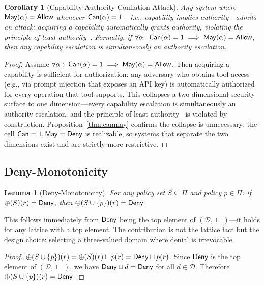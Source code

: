 \documentclass[11pt,a4paper]{article}
\newtheorem{corollary}[definition]{Corollary}
\newtheorem{lemma}[definition]{Lemma}
\newcommand{\termlabel}[1]{\ifmmode\mathsf{#1}\else{\normalfont\textsc{\MakeLowercase{#1}}}\fi}
\newcommand{\May}{\termlabel{May}}
\newcommand{\Can}{\termlabel{Can}}
\newcommand{\Allow}{\termlabel{Allow}}
\newcommand{\Deny}{\termlabel{Deny}}
\begin{document}
\begin{corollary}[Capability-Authority Conflation Attack]
\label{cor:conflation}
Any system where $\May(\alpha) = \Allow$ whenever $\Can(\alpha) = 1$---i.e., capability implies authority---admits an attack: acquiring a capability automatically grants authority, violating the principle of least authority~\citep{miller2006robust, dennis1966programming}. Formally, if $\forall \alpha: \Can(\alpha) = 1 \implies \May(\alpha) = \Allow$, then any capability escalation is simultaneously an authority escalation.
\end{corollary}

\begin{proof}
Assume $\forall\alpha:\; \Can(\alpha)=1 \implies \May(\alpha)=\Allow$.  Then acquiring a capability is sufficient for authorization: any adversary who obtains tool access (e.g., via prompt injection that exposes an API key) is automatically authorized for every operation that tool supports. This collapses a two-dimensional security surface to one dimension---every capability escalation is simultaneously an authority escalation, and the principle of least authority~\citep{miller2006robust, dennis1966programming} is violated by construction. Proposition~\ref{thm:canmay} confirms the collapse is unnecessary: the cell $\Can=1, \May=\Deny$ is realizable, so systems that separate the two dimensions exist and are strictly more restrictive.
\end{proof}

\subsection{Deny-Monotonicity}

\begin{lemma}[Deny-Monotonicity]
\label{thm:deny-mono}
For any policy set $S \subseteq \Pi$ and policy $p \in \Pi$: if $\oplus(S)(r) = \Deny$, then $\oplus(S \cup \{p\})(r) = \Deny$.
\end{lemma}

\noindent This follows immediately from $\Deny$ being the top element of $(\mathcal{D}, \sqsubseteq)$---it holds for any lattice with a top element. The contribution is not the lattice fact but the design choice: selecting a three-valued domain where denial is irrevocable.

\begin{proof}
$\oplus(S \cup \{p\})(r) = \oplus(S)(r) \sqcup p(r) = \Deny \sqcup p(r)$. Since $\Deny$ is the top element of $(\mathcal{D}, \sqsubseteq)$, we have $\Deny \sqcup d = \Deny$ for all $d \in \mathcal{D}$. Therefore $\oplus(S \cup \{p\})(r) = \Deny$.
\end{proof}
\end{document}
